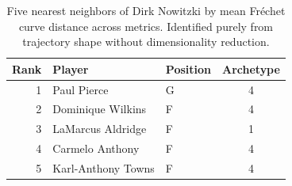 \begin{table}[htbp]
  \centering\small
  \begin{tabular}{rllc}
    \toprule
    Rank & Player & Position & Archetype \\
    \midrule
    1 & Paul Pierce & G & 4 \\
    2 & Dominique Wilkins & F & 4 \\
    3 & LaMarcus Aldridge & F & 1 \\
    4 & Carmelo Anthony & F & 4 \\
    5 & Karl-Anthony Towns & F & 4 \\
    \bottomrule
  \end{tabular}
  \caption{Five nearest neighbors of Dirk Nowitzki by mean Fr\'{e}chet curve distance across metrics. Identified purely from trajectory shape without dimensionality reduction.}
  \label{tab:Dirk_Nowitzki_frechet_curve_neighbors}
\end{table}

